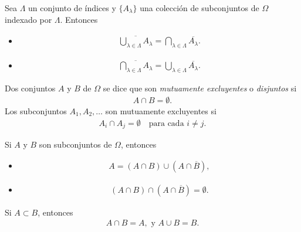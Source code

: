 \begin{Teo}
Sea $\Lambda$ un conjunto de \'indices y $\{A_\lambda\}$ una colecci\'on de subconjuntos de $\Omega$ indexado por $\Lambda$. Entonces
\begin{itemize}
\item
\begin{eqnarray*}
\overline{\bigcup_{\lambda \in \Lambda} A_\lambda}= \bigcap_{\lambda \in \Lambda} \overline{A_\lambda}.
\end{eqnarray*}
\item
\begin{eqnarray*}
\overline{\bigcap_{\lambda \in \Lambda} A_\lambda}=\bigcup_{\lambda \in \Lambda} \overline{A_\lambda}.
\end{eqnarray*}
\end{itemize}
\end{Teo}

\begin{Def} Dos conjuntos $A$ y $B$ de $\Omega$ se dice que son  \emph{mutuamente excluyentes} o \emph{disjuntos} si
\begin{eqnarray*}
A \cap B = \emptyset.
\end{eqnarray*}
Los subconjuntos $A_1, A_2, \dots$ son mutuamente excluyentes si
\begin{eqnarray*}
A_i \cap A_j = \emptyset
\quad \text{para cada } i \neq j.
\end{eqnarray*}
\end{Def}

\begin{Teo}
Si $A$ y $B$ son subconjuntos de $\Omega$, entonces
\begin{itemize}
\item
\begin{eqnarray*}
A = (A\cap B) \cup (A\cap\overline{B}),
\end{eqnarray*}
\item
\begin{eqnarray*}
(A\cap B) \cap (A\cap\overline{B}) = \emptyset.
\end{eqnarray*}
\end{itemize}
\end{Teo}


\begin{Teo}
Si $A \subset B$, entonces
\begin{eqnarray*}
A\cap B = A, \text{ y } A \cup B = B.
\end{eqnarray*}
\end{Teo}




